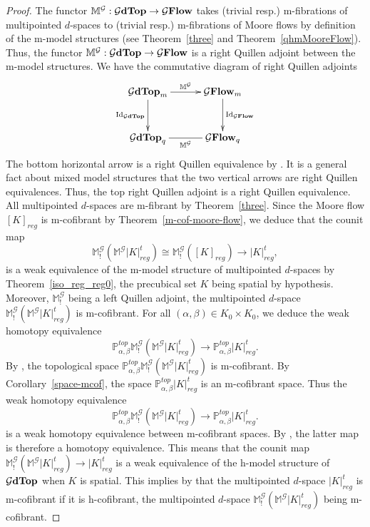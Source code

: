 \documentclass[a4paper,12pt]{amsart}
\makeatletter
\newcommand{\p}{\times}
\renewcommand{\P}{\mathbb{P}}
\newcommand{\bpf}{\begin{proof}}
\newcommand{\epf}{\end{proof}}
\theoremstyle{definition}
\newcommand{\fr}[1]{\ar@{->}[r]^-{#1}}
\newcommand{\iso}{\cong}
\newcommand{\ptop}[1]{{\brm{{#1}dTop}}}
\newcommand{\moore}{{\mathbb{M}}}
\newcommand{\lmoore}{\mathbb{M}_!}
\newcommand{\brm}[1]{{\rm{\mathbf{#1}}}}
\newcommand{\dtopG}{{\mathcal{G}\brm{Flow}}}
\DeclareMathOperator{\id}{Id}
\renewcommand{\P}{\mathbb{P}}
\makeatother
\begin{document}
\bpf
The functor $\moore^{\mathcal{G}}:\ptop{\mathcal{G}}\to \dtopG$ takes (trivial resp.) m-fibrations of multipointed $d$-spaces to (trivial resp.) m-fibrations of Moore flows by definition of the m-model structures (see Theorem~\ref{three} and Theorem~\ref{qhmMooreFlow}). Thus, the functor $\moore^{\mathcal{G}}:\ptop{\mathcal{G}}\to \dtopG$ is a right Quillen adjoint between the m-model structures. We have the commutative diagram of right Quillen adjoints 
\[
\xymatrix@C=3em@R=3em
{
	\ptop{\mathcal{G}}_m \ar@{->}[d]_-{\id_{\ptop{\mathcal{G}}}}\fr{\moore^{\mathcal{G}}} & \dtopG_m \ar@{->}[d]^-{\id_{\dtopG}}\\
	\ptop{\mathcal{G}}_q \ar@{-}[r]_-{\moore^{\mathcal{G}}} & \dtopG_q
}
\]
The bottom horizontal arrow is a right Quillen equivalence by \cite[Theorem~8.1]{Moore2}. It is a general fact about mixed model structures that the two vertical arrows are right Quillen equivalences. Thus, the top right Quillen adjoint is a right Quillen equivalence. All multipointed $d$-spaces are m-fibrant by Theorem~\ref{three}. Since the Moore flow $[K]_{reg}$ is m-cofibrant by Theorem~\ref{m-cof-moore-flow}, we deduce that the counit map 
\[
\lmoore^{\mathcal{G}}(\moore^{\mathcal{G}}|K|^t_{reg}) \iso  \lmoore^{\mathcal{G}}([K]_{reg})\longrightarrow |K|^t_{reg},
\]
is a weak equivalence of the m-model structure of multipointed $d$-spaces by Theorem~\ref{iso_reg_reg0}, the precubical set $K$ being spatial by hypothesis. Moreover, $\lmoore^{\mathcal{G}}$ being a left Quillen adjoint, the multipointed $d$-space $\lmoore^{\mathcal{G}}(\moore^{\mathcal{G}}|K|^t_{reg})$ is m-cofibrant. For all $(\alpha,\beta)\in K_0\p K_0$, we deduce the weak homotopy equivalence 
\[
\P^{top}_{\alpha,\beta}\lmoore^{\mathcal{G}}(\moore^{\mathcal{G}}|K|^t_{reg}) \longrightarrow \P^{top}_{\alpha,\beta}|K|^t_{reg}.
\]
By \cite[Theorem~8.6]{QHMmodel}, the topological space $\P^{top}_{\alpha,\beta}\lmoore^{\mathcal{G}}(\moore^{\mathcal{G}}|K|^t_{reg})$ is m-cofibrant. By Corollary~\ref{space-mcof}, the space $\P^{top}_{\alpha,\beta}|K|^t_{reg}$ is an m-cofibrant space. Thus the weak homotopy equivalence 
\[
\P^{top}_{\alpha,\beta}\lmoore^{\mathcal{G}}(\moore^{\mathcal{G}}|K|^t_{reg}) \longrightarrow \P^{top}_{\alpha,\beta}|K|^t_{reg}.
\]
is a weak homotopy equivalence between m-cofibrant spaces. By \cite[Corollary~3.4]{mixed-cole}, the latter map is therefore a homotopy equivalence. This means that the counit map $\lmoore^{\mathcal{G}}(\moore^{\mathcal{G}}|K|^t_{reg}) \to |K|^t_{reg}$ is a weak equivalence of the h-model structure of $\ptop{\mathcal{G}}$ when $K$ is spatial. This implies by \cite[Corollary~3.7]{mixed-cole} that the multipointed $d$-space $|K|^t_{reg}$ is m-cofibrant if it is h-cofibrant, the multipointed $d$-space $\lmoore^{\mathcal{G}}(\moore^{\mathcal{G}}|K|^t_{reg})$ being m-cofibrant.
\epf
\end{document}
